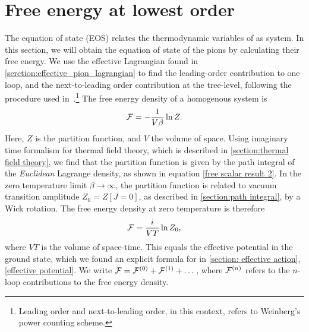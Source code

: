 \section{Free energy at lowest order}

The equation of state (EOS) relates the thermodynamic variables of as system.
In this section, we will obtain the equation of state of the pions by calculating their free energy.
We use the effective Lagrangian found in \autoref{serction:effective_pion_lagrangian} to find the leading-order contribution to one loop, and the next-to-leading order contribution at the tree-level, following the procedure used in~\cite{mojahed, Andersen:two-flavor-chpt}.\footnote{Leading order and next-to-leading order, in this context, refers to Weinberg's power counting scheme.}
The free energy density of a homogenous system is
\begin{equation}
    \mathcal{F} = - \frac{1}{V \beta} \ln Z.
\end{equation}
Here, $Z$ is the partition function, and $V$ the volume of space.
Using imaginary time formalism for thermal field theory, which is described in \autoref{section:thermal field theory}, we find that the partition function is given by the path integral of the \emph{Euclidean} Lagrange density, as shown in equation \cref{free scalar result 2}.
In the zero temperature limit $\beta \rightarrow \infty$, the partition function is related to vacuum transition amplitude $Z_0 = Z[J=0]$, as described in \autoref{section:path integral}, by a Wick rotation.
The free energy density at zero temperature is therefore 
\begin{equation}
    \mathcal{F} = \frac{i}{VT} \ln Z_0,
\end{equation}
where $VT$ is the volume of space-time.
This equals the effective potential in the ground state, which we found an explicit formula for in \autoref{section: effective action}, \cref{effective potential}.
We write $\mathcal{F} = \mathcal{F}^{(0)} + \mathcal{F}^{(1)} + \dots$, where $\mathcal{F}^{(n)}$ refers to the $n$-loop contributions to the free energy density.

